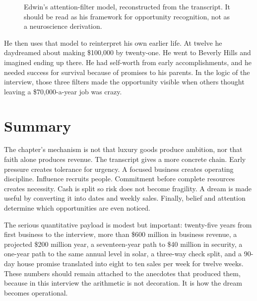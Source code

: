 \begin{figure}
\centering
{}
\caption{Edwin's attention-filter model, reconstructed from the transcript. It should be read as his framework for opportunity recognition, not as a neuroscience derivation.}
\end{figure}

He then uses that model to reinterpret his own earlier life. At twelve he daydreamed about making \$100,000 by twenty-one. He went to Beverly Hills and imagined ending up there. He had self-worth from early accomplishments, and he needed success for survival because of promises to his parents. In the logic of the interview, those three filters made the opportunity visible when others thought leaving a \$70,000-a-year job was crazy.

\section{Summary}

The chapter's mechanism is not that luxury goods produce ambition, nor that faith alone produces revenue. The transcript gives a more concrete chain. Early pressure creates tolerance for urgency. A focused business creates operating discipline. Influence recruits people. Commitment before complete resources creates necessity. Cash is split so risk does not become fragility. A dream is made useful by converting it into dates and weekly sales. Finally, belief and attention determine which opportunities are even noticed.

The serious quantitative payload is modest but important: twenty-five years from first business to the interview, more than \$600 million in business revenue, a projected \$200 million year, a seventeen-year path to \$40 million in security, a one-year path to the same annual level in solar, a three-way check split, and a 90-day house promise translated into eight to ten sales per week for twelve weeks. These numbers should remain attached to the anecdotes that produced them, because in this interview the arithmetic is not decoration. It is how the dream becomes operational.